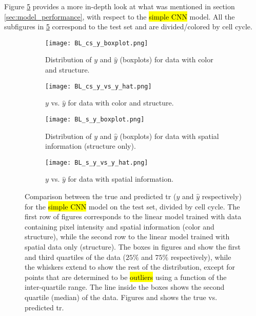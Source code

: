 
\glsresetall
\graphicspath{{./Sections/Results/Resources/}}


Figure \ref{fig:results:bl_performance} provides a more in-depth look at what was mentioned in section \ref{sec:model_performance}, with respect to the \hl{simple CNN} model. All the subfigures in \ref{fig:results:bl_performance} correspond to the test set and are divided/colored by cell cycle.

\begin{figure}[!ht]
  \centering
  \begin{subfigure}[b]{.5\linewidth}
    \texttt{[image: BL\_cs\_y\_boxplot.png]}
    \caption{Distribution of $y$ and $\hat{y}$ (boxplots) for data with color and structure.}
    \label{fig:results:bl_performance:cs_dist}
  \end{subfigure}
  \begin{subfigure}[b]{.27\linewidth}
    \texttt{[image: BL\_cs\_y\_vs\_y\_hat.png]}
    \caption{$y$ vs. $\hat{y}$ for data with color and structure.}
    \label{fig:results:bl_performance:cs_y_vs_y_hat}
  \end{subfigure}%
  \vspace{3mm}
  \begin{subfigure}[b]{.5\linewidth}
    \texttt{[image: BL\_s\_y\_boxplot.png]}
    \caption{Distribution of $y$ and $\hat{y}$ (boxplots) for data with spatial information (structure only).}
    \label{fig:results:bl_performance:s_dist}
  \end{subfigure}
  \begin{subfigure}[b]{.27\linewidth}
    \texttt{[image: BL\_s\_y\_vs\_y\_hat.png]}
    \caption{$y$ vs. $\hat{y}$ for data with spatial information.}
    \label{fig:results:bl_performance:s_y_vs_y_hat}
  \end{subfigure}
  \caption{Comparison between the true and predicted \gls{tr} ($y$ and $\hat{y}$ respectively) for the \hl{simple CNN} model on the test set, divided by cell cycle. The first row of figures corresponds to the linear model trained with data containing pixel intensity and spatial information (color and structure), while the second row to the linear model trained with spatial data only (structure). The boxes in figures  and  show the first and third quartiles of the data ($25\%$ and $75\%$ respectively), while the whiskers extend to show the rest of the distribution, except for points that are determined to be \hl{outliers} using a function of the inter-quartile range. The line inside the boxes shows the second quartile (median) of the data. Figures  and  shows the true vs. predicted \gls{tr}.}
  \label{fig:results:bl_performance}
\end{figure}

